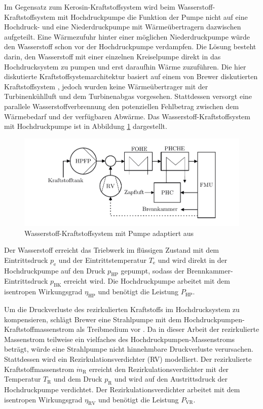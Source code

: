 Im Gegensatz zum Kerosin-Kraftstoffsystem wird beim Wasserstoff-Kraftstoffsystem mit Hochdruckpumpe die Funktion der Pumpe nicht auf eine Hochdruck- und eine Niederdruckpumpe mit Wärmeübertragern dazwischen aufgeteilt. Eine Wärmezufuhr hinter einer möglichen Niederdruckpumpe würde den Wasserstoff schon vor der Hochdruckpumpe verdampfen. Die Lösung besteht darin, den Wasserstoff mit einer einzelnen Kreiselpumpe direkt in das Hochdrucksystem zu pumpen und erst daraufhin Wärme zuzuführen. Die hier diskutierte Kraftstoffsystemarchitektur basiert auf einem von Brewer diskutierten Kraftstoffsystem \cite{Brewer.1991}, jedoch wurden keine Wärmeübertrager mit der Turbinenkühlluft und dem Turbinenabgas vorgesehen. Stattdessen versorgt eine parallele Wasserstoffverbrennung den potenziellen Fehlbetrag zwischen dem Wärmebedarf und der verfügbaren Abwärme. Das Wasserstoff-Kraftstoffsystem mit Hochdruckpumpe ist in  Abbildung \ref{fig:pumpe} dargestellt.

\begin{figure}[ht]
\centering
\includegraphics[width=1\linewidth]{4_Abbildungen/2_Hauptteil/Kraftstoffsystem Abbildungen/pump.pdf}
  \caption{Wasserstoff-Kraftstoffsystem mit Pumpe adaptiert aus \cite{Brewer.1991}}
  \label{fig:pumpe}
\end{figure}
\FloatBarrier 

Der Wasserstoff erreicht das Triebwerk im flüssigen Zustand mit dem Eintrittsdruck $p_\mathrm{e}$ und der Eintrittstemperatur $T_\mathrm{e}$ und wird direkt in der Hochdruckpumpe auf den Druck $p_{\mathrm{HP}}$ gepumpt, sodass der Brennkammer-Eintrittsdruck $p_{\mathrm{BK}}$ erreicht wird. Die Hochdruckpumpe arbeitet mit dem isentropen Wirkungsgrad $\eta_{\mathrm{HP}}$ und benötigt die Leistung $P_{\mathrm{HP}}$. 

Um die Druckverluste des rezirkulierten Kraftstoffs im Hochdrucksystem zu kompensieren, schlägt Brewer eine Strahlpumpe mit dem  Hochdruckpumpen-Kraftstoffmassenstrom als Treibmedium vor \cite{Brewer.1991}. Da in dieser Arbeit der rezirkulierte Massenstrom teilweise ein vielfaches des Hochdruckpumpen-Massenstroms beträgt, würde eine Strahlpumpe nicht hinnehmbare Druckverluste verursachen. Stattdessen wird ein Rezirkulationsverdichter (RV) modelliert. Der rezirkulierte Kraftstoffmassenstrom $\dot{m}_\mathrm{R}$ erreicht den Rezirkulationsverdichter mit der Temperatur $T_\mathrm{R}$ und dem Druck $p_\mathrm{R}$ und wird auf den Austrittsdruck der Hochdruckpumpe verdichtet. Der Rezirkulationsverdichter arbeitet mit dem isentropen Wirkungsgrad $\eta_\mathrm{RV}$ und benötigt die Leistung $P_\mathrm{VR}$. 

